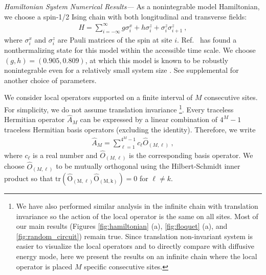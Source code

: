 \documentclass[twocolumn,superscriptaddress, prb]{revtex4-1}
\begin{document}
{\it Hamiltonian System Numerical Results---}
As a nonintegrable model Hamiltonian, we choose a spin-1/2 Ising chain with both longitudinal and transverse fields:
\begin{align}
H = \sum_{i = -\infty}^{\infty} g\sigma^x_i + h\sigma^z_i + \sigma^z_i \sigma^z_{i+1} ~,
\label{eq:Hamiltonian}
\end{align}
where $\sigma^x_i$ and $\sigma^z_i$ are Pauli matrices of the spin at site $i$.
Ref.~ has found a nonthermalizing state for this model within the accessible time scale.
We choose $(g,h) = (0.905, 0.809)$, at which this model is known to be robustly nonintegrable even for a relatively small system size \cite{Kim:2013}.
See supplemental for another choice of parameters.

We consider local operators supported on a finite interval of $M$ consecutive sites. %
For simplicity, we do not assume translation invariance
\footnote{We have also performed similar analysis in the infinite chain with translation invariance so the action of the local operator is the same on all sites. Most of our main results (Figures \ref{fig:hamiltonian} (a), \ref{fig:floquet} (a), and \ref{fig:random_circuit})
remain true. Since translation non-invariant system is easier to visualize the local operators and to directly compare with diffusive energy mode, here we present the results on an infinite chain where the local operator is placed $M$ specific consecutive sites.}.
Every traceless Hermitian operator
$\hat{A}_M$ can be expressed by a linear combination of $4^M - 1$ traceless Hermitian basis operators (excluding the identity).
Therefore, we write
\begin{align}
\hat{A}_M = \sum_{\ell = 1}^{4^M - 1} c_\ell \hat{O}_{(M,\ell)} ~,
\end{align}
where $c_\ell$ is a real number and $\hat{O}_{(M,\ell)}$ is the corresponding basis operator.
We choose $\hat{O}_{(M,\ell)}$ to be mutually orthogonal using the Hilbert-Schmidt inner product so that
$\mathrm{tr(\hat{O}_{(M,\ell)} \hat{O}_{(M,k)})} = 0$ for $\ell\neq k$.
\end{document}
